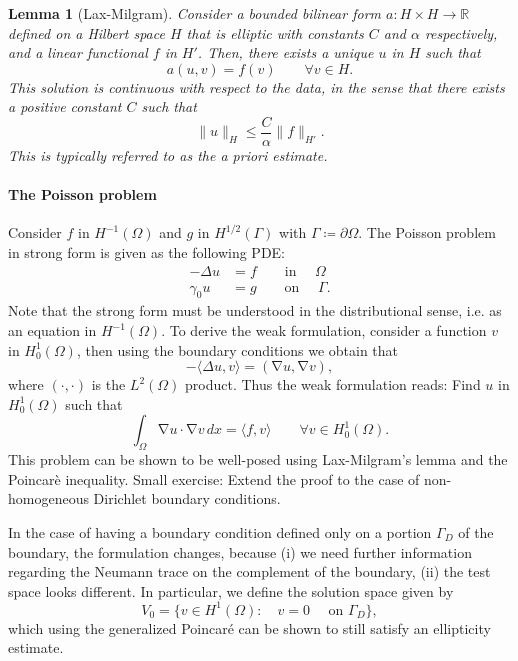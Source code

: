 \documentclass{article}
\DeclareMathOperator{\grad}{\nabla}
\newcommand{\R}{\mathbb{R}}
\newcommand{\tin}{\text{in }}
\newcommand{\ton}{\text{on }}
\newtheorem{lemma}{Lemma}
\begin{document}
\begin{lemma}[Lax-Milgram] Consider a bounded bilinear form $a: H\times H\to \R$ defined on a Hilbert space $H$ that is elliptic with constants $C$ and $\alpha$ respectively, and a linear functional $f$ in $H'$. Then, there exists a unique $u$ in $H$ such that 
    $$ a(u, v) = f(v) \qquad \forall v \in H. $$
This solution is continuous with respect to the data, in the sense that there exists a positive constant $C$ such that 
    $$ \| u\|_H \leq \frac C \alpha \| f \|_{H'} .$$
This is typically referred to as the \emph{a priori} estimate. 
\end{lemma}



\paragraph{The Poisson problem} Consider $f$ in $H^{-1}(\Omega)$ and $g$ in $H^{1/2}(\Gamma)$ with $\Gamma\coloneqq \partial\Omega$. The Poisson problem in strong form is given as the following PDE: 
    \begin{align*}
        -\Delta u  &= f \qquad \tin\quad\Omega\\
        \gamma_0 u &= g \qquad \ton\quad \Gamma.
    \end{align*}
Note that the strong form must be understood in the distributional sense, i.e. as an equation in $H^{-1}(\Omega)$. To derive the weak formulation, consider a function $v$ in $H_0^1(\Omega)$, then using the boundary conditions we obtain that 
    $$ -\langle \Delta u,v\rangle = (\grad u, \grad v),$$
where $(\cdot, \cdot)$ is the $L^2(\Omega)$ product. Thus the weak formulation reads: Find $u$ in $H_0^1(\Omega)$ such that 
    $$ \int_\Omega \grad u\cdot \grad v\,dx = \langle f, v\rangle \qquad \forall v\in H_0^1(\Omega).$$
This problem can be shown to be well-posed using Lax-Milgram's lemma and the Poincarè inequality. Small exercise: Extend the proof to the case of non-homogeneous Dirichlet boundary conditions.

In the case of having a boundary condition defined only on a portion $\Gamma_D$ of the boundary, the formulation changes, because (i) we need further information regarding the Neumann trace on the complement of the boundary, (ii) the test space looks different. In particular, we define the solution space given by 
    $$ V_0 = \{v\in H^1(\Omega): \quad v = 0 \quad\text{ on $\Gamma_D$}\}, $$
which using the generalized Poincaré can be shown to still satisfy an ellipticity estimate. 
\end{document}

